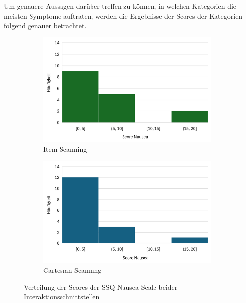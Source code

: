 Um genauere Aussagen darüber treffen zu können, in welchen Kategorien die meisten Symptome auftraten, werden die Ergebnisse der Scores der Kategorien folgend genauer betrachtet.

\begin{figure}
    \centering
    \begin{subfigure}{.5\textwidth}
        \centering
        \includegraphics[width=0.99\textwidth]{images/Results/Histogramm-Nausea-Scale-Item.png}
        \caption{Item Scanning}
        \label{fig:histoNauseaItem}   
    \end{subfigure}%
    \begin{subfigure}{.5\textwidth}
        \centering
        \includegraphics[width=0.99\textwidth]{images/Results/Histogramm-Nausea-Scale-Cartesian.png}
         \caption{Cartesian Scanning}
         \label{fig:histoNauseaCartesian}
    \end{subfigure}
    \caption{Verteilung der Scores der SSQ Nausea Scale beider Interaktionsschnittstellen}
    \label{fig:histoNausea}
\end{figure}

